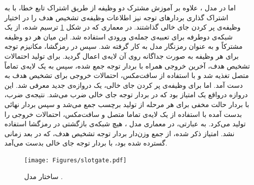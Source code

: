 اما در مدل  \cite{goo-etal-2018-slot}، علاوه بر آموزش مشترک دو وظیفه از طریق اشتراک تابع خطا، با به اشتراک گذاری بردارهای توجه نیز اطلاعات وظیفه‌ی تشخیص هدف را در اختیار وظیفه‌ی پر کردن جای خالی گذاشتند. در معماری  که در شکل \ref{Fig:slotgate} ترسیم شده، از یک شبکه‌ی  دوطرفه برای تعبیه‌ی جمله‌ی ورودی استفاده شد. این  میان هر دو وظیفه مشترکاً و به عنوان رمزنگار مدل به کار گرفته شد. سپس در رمزگشا، مکانیزم توجه \cite{attention_bahdanau} برای هر وظیفه به صورت جداگانه روی آن لایه‌ی  اعمال گردید. برای تولید احتمالات تشخیص هدف، آخرین خروجی  همراه با بردار توجه جمع شده، سپس به یک لایه‌ی تماماً متصل تغذیه شد و با استفاده از سافت‌مکس، احتمالات خروجی برای تشخیص هدف به دست آمد.  اما برای وظیفه‌ی پر کردن جای خالی، یک دروازه‌ی جدید معرفی شد. این دروازه درواقع یک امتیاز بود که در بردار توجه جای خالی ضرب می‌شد. نتیجه‌ی ضرب، با بردار حالت مخفی برای هر مرحله از تولید برچسب جمع می‌شد و سپس بردار نهائی بدست آمده با استفاده از یک لایه‌ی تماما متصل و سافت‌مکس، احتمالات خروجی را تولید می‌کرد. به عبارتی، در معماری مدل ، هیچ شبکه‌ی بازگشتی در رمزگشا استفاده نشد. امتیاز ذکر شده، از جمع وزن‌دار بردار توجه تشخیص هدف، که در بعد زمانی گسترده شده بود، با بردار توجه جای خالی بدست می‌آمد. 
\begin{figure}[!htb]
	\centering
	\texttt{[image: Figures/slotgate.pdf]}
	\caption[ساختار مدل ]{ساختار مدل  \cite{goo-etal-2018-slot}.}
	\label{Fig:slotgate}
\end{figure}


